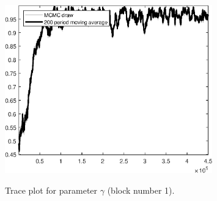\begin{figure}[H]
\centering
  \includegraphics[width=0.8\textwidth]{BRS_sectoral_wo_vcu/graphs/TracePlot_gam_blck_1}\\
    \caption{Trace plot for parameter $\gamma$ (block number 1).}
\end{figure}
